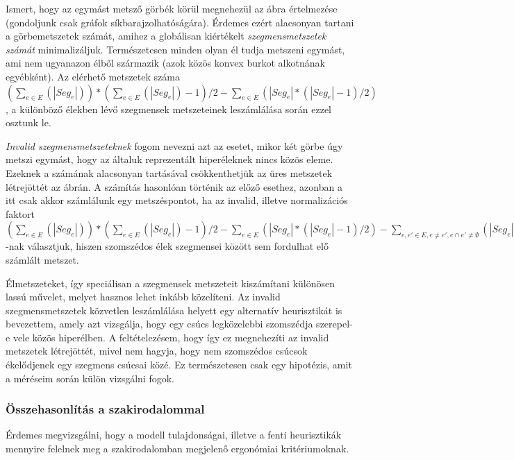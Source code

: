 Ismert, hogy az egymást metsző görbék körül megnehezül az ábra értelmezése (gondoljunk csak gráfok síkbarajzolhatóságára). Érdemes ezért alacsonyan tartani a görbemetszetek számát, amihez a globálisan kiértékelt \textit{szegmensmetszetek számát} minimalizáljuk. Természetesen minden olyan él tudja metszeni egymást, ami nem ugyanazon élből származik (azok közös konvex burkot alkotnának egyébként). Az elérhető metszetek száma $(\sum_{e \in E}(|Seg_e|))*(\sum_{e \in E}(|Seg_e|)-1) / 2 - \sum_{e \in E}(|Seg_e|*(|Seg_e|-1) / 2)$, a különböző élekben lévő szegmensek metszeteinek leszámlálása során ezzel osztunk le.


\textit{Invalid szegmensmetszeteknek} fogom nevezni azt az esetet, mikor két görbe úgy metszi egymást, hogy az általuk reprezentált hiperéleknek nincs közös eleme. Ezeknek a számának alacsonyan tartásával csökkenthetjük az üres metszetek létrejöttét az ábrán. A számítás hasonlóan történik az előző esethez, azonban a itt csak akkor számlálunk egy metszéspontot, ha az invalid, illetve normalizációs faktort $(\sum_{e \in E}(|Seg_e|))*(\sum_{e \in E}(|Seg_e|)-1) / 2 - \sum_{e \in E}(|Seg_e|*(|Seg_e|-1) / 2) - \sum_{e, e' \in E, e \neq e', e \cap e' \neq \emptyset}(|Seg_e|*|Seg_{e'}|)$-nak választjuk, hiszen szomszédos élek szegmensei között sem fordulhat elő számlált metszet.


Élmetszeteket, így speciálisan a szegmensek metszeteit kiszámítani különösen lassú művelet, melyet hasznos lehet inkább közelíteni. Az invalid szegmensmetszetek közvetlen leszámlálása helyett egy alternatív heurisztikát is bevezettem, amely azt vizsgálja, hogy egy csúcs legközelebbi szomszédja szerepel-e vele közös hiperélben. A feltételezésem, hogy így ez megnehezíti az invalid metszetek létrejöttét, mivel nem hagyja, hogy nem szomszédos csúcsok ékelődjenek egy szegmens csúcsai közé. Ez természetesen csak egy hipotézis, amit a méréseim során külön vizsgálni fogok.


\subsubsection{Összehasonlítás a szakirodalommal}

Érdemes megvizsgálni, hogy a modell tulajdonságai, illetve a fenti heurisztikák mennyire felelnek meg a szakirodalomban megjelenő ergonómiai kritériumoknak.


